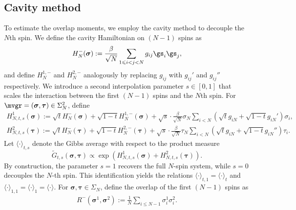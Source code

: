 \documentclass[letterpaper,11pt,reqno]{amsart}
\renewcommand{\leq}{\leqslant}
\newcommand{\ra}{\rangle}
\newcommand{\la}{\langle}
\newcommand{\mvgs}{\boldsymbol{\sigma}}\newcommand{\mvgS}{\boldsymbol{\Sigma}}\newcommand{\mvgt}{\boldsymbol{\tau}}
\begin{document}
\subsection{Cavity method}
To estimate the overlap moments, we employ the cavity method to decouple the $N$th spin.
We define the cavity Hamiltonian on $(N-1)$ spins as 
\begin{align*} 
H_{N}^{-} (\mvgs) := \frac{\beta}{\sqrt{N}} \sum_{1 \leq i< j < N} g_{ij} \gs_i \gs_j,
\end{align*}
and define $H_{N}^{1,-}$ and $H_{N}^{2,-}$ analogously by replacing $g_{ij}$ with $g_{ij}'$ and $g_{ij}''$ respectively.
We introduce a second interpolation parameter $s \in [0,1]$ that scales the interaction between the first $(N-1)$ spins and the $N$th spin. For $\mvgr = (\mvgs, \mvgt) \in \Sigma_{N}^2$, define
\begin{align*}
    H_{N,t,s}^1 (\mvgs) 
    := \sqrt{t} H_{N}^- (\mvgs) + \sqrt{1-t} H_{N}^{1,-} (\mvgs) + \sqrt{s} \cdot \frac{\beta}{\sqrt{N}} \sigma_N \sum_{i<N} (\sqrt{t} g_{iN} + \sqrt{1-t}  g_{iN}') \sigma_i,
\end{align*}
\begin{align*}
    H_{N,t,s}^2 (\mvgt) 
    := \sqrt{t} H_{N}^- (\mvgt) + \sqrt{1-t} H_{N}^{2,-} (\mvgt) + \sqrt{s} \cdot \frac{\beta}{\sqrt{N}} \tau_N \sum_{i<N} (\sqrt{t} g_{iN} + \sqrt{1-t}  g_{iN}'') \tau_i.
\end{align*}
Let $\la \cdot \ra_{t,s}$ denote the Gibbs average with respect to the product measure 
$$
\tilde{G}_{t,s}(\mvgs, \mvgt) \propto \exp(H_{N,t,s}^1(\mvgs) + H_{N,t,s}^2(\mvgt)).
$$
By construction, the parameter $s=1$ recovers the full $N$-spin system, while $s=0$ decouples the $N$-th spin. This identification yields the relations 
\(
\la \cdot \ra_{t,1} = \la \cdot \ra_{t}\) and \(\la \cdot \ra_{1,1} = \la \cdot \ra_{1} = \la \cdot \ra.
\)
For \(\mvgs, \mvgt \in \Sigma_N\), define the overlap of the first \((N-1)\) spins as 
\begin{align*}
R^-(\mvgs^1, \mvgs^2) := \frac{1}{N} \sum_{i \leq N-1} \sigma_i^1 \sigma_i^2.
\end{align*}
\end{document}
